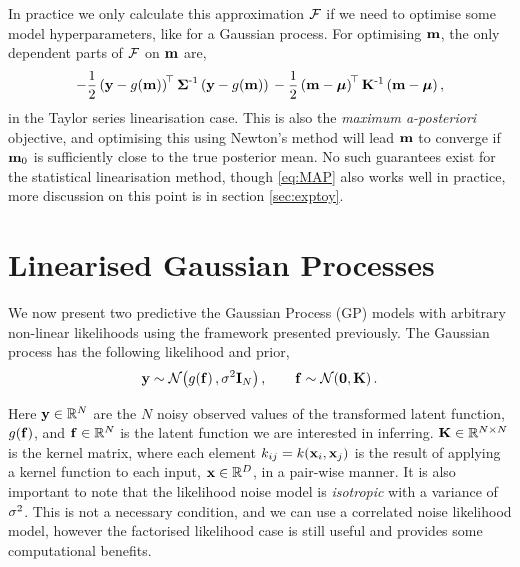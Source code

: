 \documentclass{article} %
\begin{document}
In practice we only calculate this approximation $\mathcal{F}$ if we need to
optimise some model hyperparameters, like for a Gaussian process. For
optimising $\mathbf{m}$, the only dependent parts of $\mathcal{F}$ on $\mathbf{m}$ are,
\begin{equation}
    -\frac{1}{2} \left({\mathbf{y} - g\!\left({{\mathbf{m}}}\right)}\right)^{\!\top}
            \boldsymbol{\Sigma}^{\text{-}1}
            \left({\mathbf{y} - g\!\left({{\mathbf{m}}}\right)}\right) \\
    -\frac{1}{2}
        \left({\mathbf{m} - \boldsymbol{\mu}}\right)^{\!\top}
        \mathbf{K}^{\text{-}1}
        \left({\mathbf{m} - \boldsymbol{\mu}}\right),
    \label{eq:MAP}
\end{equation}
in the Taylor series linearisation case. This is also the \emph{maximum
    a-posteriori} objective, and optimising this using Newton's method will
lead $\mathbf{m}$ to converge if $\mathbf{m}_0$ is sufficiently close to the true
posterior mean. No such guarantees exist for the statistical linearisation
method, though \eqref{eq:MAP} also works well in practice, more discussion on
this point is in section \ref{sec:exptoy}. 


\section{Linearised Gaussian Processes}
\label{sec:gpmod}

We now present two predictive the Gaussian Process (GP) models
\cite{Rasmussen2006} with arbitrary non-linear likelihoods using the framework
presented previously. The Gaussian process has the following likelihood and
prior,
\begin{equation}
    \mathbf{y} \sim \mathcal{N}\!\left({g\!\left({{\mathbf{f}}}\right), \sigma^2\mathbf{I}_{N}}\right), \qquad
    \mathbf{f} \sim \mathcal{N}\!\left({\mathbf{0}, \mathbf{K}}\right).
    \label{eq:gplikeprior}
\end{equation}

Here $\mathbf{y} \in \mathbb{R}^{N}$ are the $N$ noisy observed values of the transformed
latent function, $g\!\left({{\mathbf{f}}}\right)$, and $\mathbf{f} \in \mathbb{R}^{N}$ is the latent
function we are interested in inferring. $\mathbf{K} \in \mathbb{R}^{N\times N}$ is the
kernel matrix, where each element $k_{ij} = k\!\left({\mathbf{x}_i,
    \mathbf{x}_j}\right)$ is the result of applying a kernel function to each input,
$\mathbf{x} \in \mathbb{R}^{D}$, in a pair-wise manner. It is also important to note that
the likelihood noise model is \emph{isotropic} with a variance of $\sigma^2$. This
is not a necessary condition, and we can use a correlated noise likelihood
model, however the factorised likelihood case is still useful and provides some
computational benefits. 
    
\end{document}
